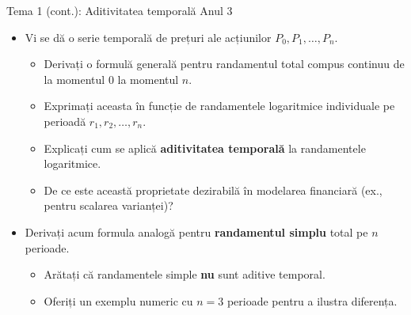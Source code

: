 \documentclass[9pt, aspectratio=169, t]{beamer}
\theoremstyle{definition}
\begin{document}
\begin{frame}{Tema 1 (cont.): Aditivitatea temporală \hfill {\small\textcolor{Forest}{Anul 3}}}
\begin{itemize}
    \item Vi se dă o serie temporală de prețuri ale acțiunilor $P_0, P_1, \ldots, P_n$.
    \begin{itemize}
        \item Derivați o formulă generală pentru randamentul total compus continuu de la momentul $0$ la momentul $n$.
        \item Exprimați aceasta în funcție de randamentele logaritmice individuale pe perioadă $r_1, r_2, \ldots, r_n$.
        \item Explicați cum se aplică \textbf{aditivitatea temporală} la randamentele logaritmice.
        \item De ce este această proprietate dezirabilă în modelarea financiară (ex., pentru scalarea varianței)?
    \end{itemize}
    \item Derivați acum formula analogă pentru \textbf{randamentul simplu} total pe $n$ perioade.
    \begin{itemize}
        \item Arătați că randamentele simple \textbf{nu} sunt aditive temporal.
        \item Oferiți un exemplu numeric cu $n=3$ perioade pentru a ilustra diferența.
    \end{itemize}
\end{itemize}
\end{frame}
\end{document}
